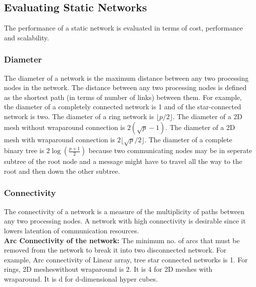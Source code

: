\documentclass[12pt]{article}
\begin{document}
\subsection{Evaluating Static Networks}
The performance of a static network is evaluated in terms of cost, performance and scalability.
\subsubsection{Diameter} 
The diameter of a network is the maximum distance between any two processing nodes in the network. The distance between 
any two processing nodes is defined as the shortest path (in terms of number of links) between them. 
For example, the diameter of a completely connected network is 1 and of the star-connected network is two. The diameter of 
a ring network is $\lfloor p/2 \rfloor$. The diameter of a 2D mesh without wraparound connection is $2(\sqrt{p}-1)$.
The diameter of a 2D mesh with wraparound connection is $2\lfloor\sqrt{p}/2\rfloor$.
The diameter of a complete binary tree is $2\log(\frac{p+1}{2})$ because two communicating nodes may be in seperate subtree of the root node and a message might have to travel
all the way to the root and then down the other subtree.

\subsubsection{Connectivity}
The connectivity of a network is a measure of the multiplicity of paths between any two processing nodes. A network with high connectivity is desirable since it lowers latention of communication resources.\\
\textbf{Arc Connectivity of the network: }The minimum no. of arcs that must be removed from the network to break it into two disconnected network. 
For example, Arc connectivity of Linear array, tree star connected networks is 1. 
For rings, 2D mesheswithout wraparound is 2. It is 4 for 2D meshes with wraparound. It is d for d-dimensional hyper cubes.
\end{document}
